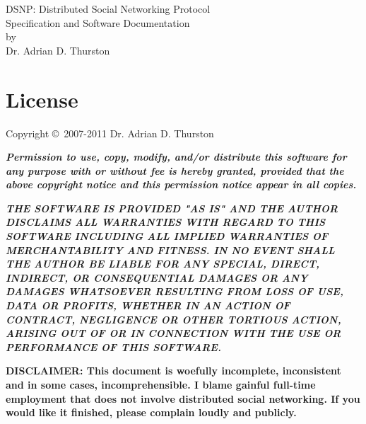 \documentclass[letterpaper,11pt,oneside]{article}
\begin{document}
%
%
\thispagestyle{empty}
\begin{center}
{\huge DSNP: Distributed Social Networking Protocol}\\
\vspace*{12pt}
{\Large Specification and Software Documentation}\\
\vspace{12pt}
by\\
\vspace{12pt}
{\large Dr. Adrian D. Thurston}\\
\end{center}


\vspace{1.5in}

\section*{License}

Copyright \copyright\ 2007-2011 Dr. Adrian D. Thurston

\vspace{5pt}

{\bf\it\noindent Permission to use, copy, modify, and/or distribute this
software for any purpose with or without fee is hereby granted, provided that
the above copyright notice and this permission notice appear in all copies.}

\vspace{5pt}

{\bf\it\noindent
THE SOFTWARE IS PROVIDED "AS IS" AND THE AUTHOR DISCLAIMS ALL WARRANTIES
WITH REGARD TO THIS SOFTWARE INCLUDING ALL IMPLIED WARRANTIES OF
MERCHANTABILITY AND FITNESS. IN NO EVENT SHALL THE AUTHOR BE LIABLE FOR
ANY SPECIAL, DIRECT, INDIRECT, OR CONSEQUENTIAL DAMAGES OR ANY DAMAGES
WHATSOEVER RESULTING FROM LOSS OF USE, DATA OR PROFITS, WHETHER IN AN
ACTION OF CONTRACT, NEGLIGENCE OR OTHER TORTIOUS ACTION, ARISING OUT OF
OR IN CONNECTION WITH THE USE OR PERFORMANCE OF THIS SOFTWARE.}


\vspace{2in}
{\noindent\bf\large DISCLAIMER: This document is woefully incomplete,
inconsistent and in some cases, incomprehensible. I blame gainful full-time
employment that does not involve distributed social networking. If you would
like it finished, please complain loudly and publicly.}

\newpage

\tableofcontents
\end{document}
